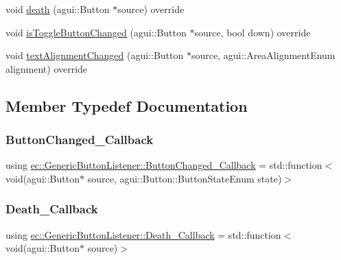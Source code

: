 \begin{DoxyCompactItemize}
\item 
void \mbox{\hyperlink{classec_1_1_generic_button_listener_a21f4b1a65d80f3f715a3f4ce51dce39e}{death}} (agui\+::\+Button $\ast$source) override
\item 
void \mbox{\hyperlink{classec_1_1_generic_button_listener_a23135a254fea72679eb994e5d6209a18}{is\+Toggle\+Button\+Changed}} (agui\+::\+Button $\ast$source, bool down) override
\item 
void \mbox{\hyperlink{classec_1_1_generic_button_listener_a314ef307095e669783157eeceb452ff6}{text\+Alignment\+Changed}} (agui\+::\+Button $\ast$source, agui\+::\+Area\+Alignment\+Enum alignment) override
\end{DoxyCompactItemize}


\subsection{Member Typedef Documentation}
\mbox{\label{classec_1_1_generic_button_listener_af89147c1baeadae9155f5d4e0df7abf3}} 
\subsubsection{\texorpdfstring{Button\+Changed\+\_\+\+Callback}{ButtonChanged\_Callback}}
{\footnotesize\ttfamily using \mbox{\hyperlink{classec_1_1_generic_button_listener_af89147c1baeadae9155f5d4e0df7abf3}{ec\+::\+Generic\+Button\+Listener\+::\+Button\+Changed\+\_\+\+Callback}} =  std\+::function$<$void(agui\+::\+Button$\ast$ source, agui\+::\+Button\+::\+Button\+State\+Enum state)$>$}

\mbox{\label{classec_1_1_generic_button_listener_aa7ca8b30098ab89eff663950d25a13eb}} 
\subsubsection{\texorpdfstring{Death\+\_\+\+Callback}{Death\_Callback}}
{\footnotesize\ttfamily using \mbox{\hyperlink{classec_1_1_generic_button_listener_aa7ca8b30098ab89eff663950d25a13eb}{ec\+::\+Generic\+Button\+Listener\+::\+Death\+\_\+\+Callback}} =  std\+::function$<$void(agui\+::\+Button$\ast$ source)$>$}

